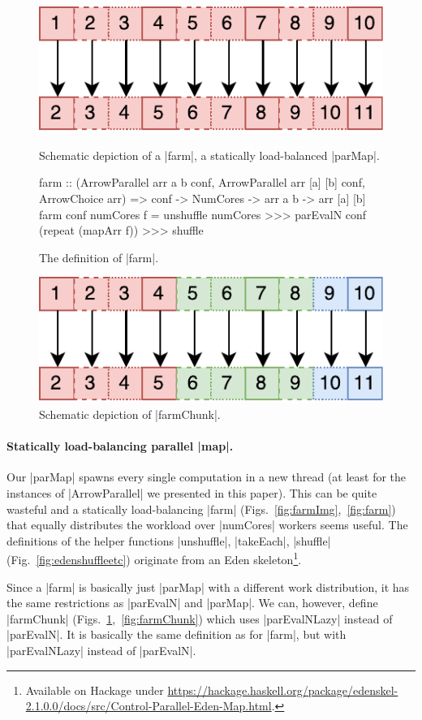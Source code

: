\begin{figure}[thb]
\includegraphics[scale=0.7]{images/farm}
\caption{Schematic depiction of a |farm|, a statically
      load-balanced |parMap|.}
\label{fig:farmImg}

\begin{code}
farm :: (ArrowParallel arr a b conf,
	ArrowParallel arr [a] [b] conf, ArrowChoice arr) =>
	conf -> NumCores -> arr a b -> arr [a] [b]
farm conf numCores f =
	unshuffle numCores >>>
	parEvalN conf (repeat (mapArr f)) >>>
	shuffle
\end{code}
\caption{The definition of |farm|.}
\label{fig:farm}

\includegraphics[scale=0.7]{images/farmChunk}
\caption{Schematic depiction of |farmChunk|.}
\label{fig:farmChunkImg}
\end{figure}

\paragraph{Statically load-balancing parallel |map|.}
Our |parMap| spawns every single computation in a new thread (at least for the instances of |ArrowParallel| we presented in this paper). This can be quite wasteful and a statically load-balancing |farm| (Figs.~\ref{fig:farmImg},~\ref{fig:farm}) that equally distributes the workload over |numCores| workers seems useful.
The definitions of the helper functions |unshuffle|, |takeEach|, |shuffle| (Fig.~\ref{fig:edenshuffleetc}) originate from an Eden skeleton\footnote{Available on Hackage under \url{https://hackage.haskell.org/package/edenskel-2.1.0.0/docs/src/Control-Parallel-Eden-Map.html}.}.

Since a |farm|  is basically just |parMap| with a different work distribution, it has the same restrictions as |parEvalN| and |parMap|. We can, however, define |farmChunk| (Figs.~\ref{fig:farmChunkImg},~\ref{fig:farmChunk}) which uses |parEvalNLazy| instead of |parEvalN|. It is basically the same definition as for |farm|, but with |parEvalNLazy| instead of |parEvalN|.

